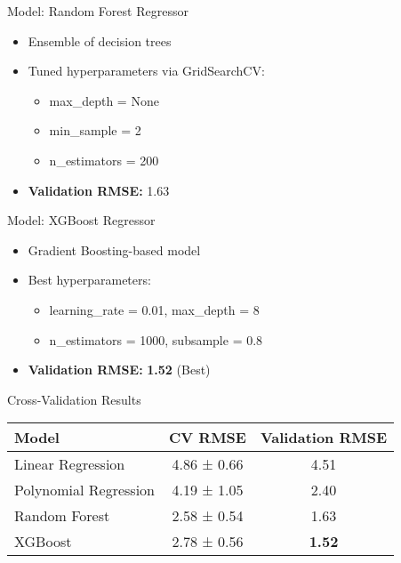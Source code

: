 \documentclass{beamer}
\begin{document}
\begin{frame}{Model: Random Forest Regressor}
  \begin{itemize}
    \item Ensemble of decision trees
    \item Tuned hyperparameters via GridSearchCV:
        \begin{itemize}
            \item max\_depth = None
            \item min\_sample = 2
            \item n\_estimators = 200
        \end{itemize}  
    \item \textbf{Validation RMSE:} 1.63
  \end{itemize}
\end{frame}

\begin{frame}{Model: XGBoost Regressor}
  \begin{itemize}
    \item Gradient Boosting-based model
    \item Best hyperparameters:
    \begin{itemize}
        \item learning\_rate = 0.01, max\_depth = 8
        \item n\_estimators = 1000, subsample = 0.8
    \end{itemize}
    \item \textbf{Validation RMSE:} \textbf{1.52} (Best)
  \end{itemize}
\end{frame}

\begin{frame}{Cross-Validation Results}
\begin{center}
\begin{tabular}{lcc}
\toprule
\textbf{Model} & \textbf{CV RMSE} & \textbf{Validation RMSE} \\
\midrule
Linear Regression & 4.86 ± 0.66 & 4.51 \\
Polynomial Regression & 4.19 ± 1.05 & 2.40 \\
Random Forest & 2.58 ± 0.54 & 1.63 \\
XGBoost & 2.78 ± 0.56 & \textbf{1.52} \\
\bottomrule
\end{tabular}
\end{center}
\end{frame}
\end{document}
